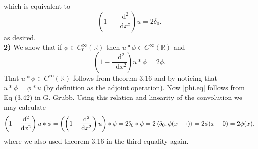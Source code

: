 \documentclass[a4paper,11pt]{article}
\newcommand*\diff{\mathop{}\!\mathrm{d}}
\newcommand{\R}{\mathbb{R}}
\numberwithin{equation}{section}
\begin{document}
which is equivalent to \begin{equation}
\left(1-\frac{\diff^2}{\diff x^2}\right)u=2\delta_0.
\end{equation}
as desired.\\
\textbf{2)} We show that if $ \phi\in C^\infty_0(\R) $ then $ u\ast\phi\in C^\infty(\R) $ and \begin{equation}\label{phi.eq}
\left(1-\frac{\diff^2}{\diff x^2}\right)u\ast\phi=2\phi.
\end{equation}
That $ u\ast \phi\in C^\infty(\R) $ follows from theorem 3.16 and by noticing that $ u\ast\phi=\phi\ast u $ (by definition as the adjoint operation). Now \eqref{phi.eq} follows from Eq (3.42) in G. Grubb. Using this relation and linearity of the convolution we may calculate\begin{equation}
\left(1-\frac{\diff^2}{\diff x^2}\right)u\ast\phi=\left(\left(1-\frac{\diff^2}{\diff x^2}\right)u\right)\ast\phi=2\delta_0\ast\phi=2\braket{\delta_0,\phi(x-\cdot)}=2\phi(x-0)=2\phi(x).
\end{equation}
where we also used theorem 3.16 in the third equality again.
\end{document}
